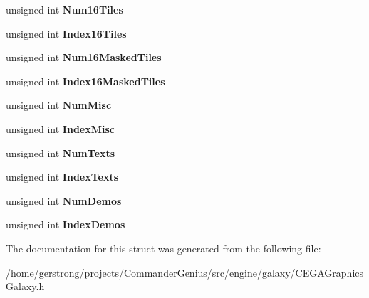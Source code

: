 \begin{DoxyCompactItemize}
\item 
\hypertarget{structgalaxy_1_1_episode_info_struct_ad7a7bb833553ebe16a7a545f356f29f6}{
unsigned int {\bfseries Num16Tiles}}
\label{structgalaxy_1_1_episode_info_struct_ad7a7bb833553ebe16a7a545f356f29f6}

\item 
\hypertarget{structgalaxy_1_1_episode_info_struct_a87b40fe870cb3f02fde25c795aeea388}{
unsigned int {\bfseries Index16Tiles}}
\label{structgalaxy_1_1_episode_info_struct_a87b40fe870cb3f02fde25c795aeea388}

\item 
\hypertarget{structgalaxy_1_1_episode_info_struct_ac8ad38c23ce44386c26d202b79007b28}{
unsigned int {\bfseries Num16MaskedTiles}}
\label{structgalaxy_1_1_episode_info_struct_ac8ad38c23ce44386c26d202b79007b28}

\item 
\hypertarget{structgalaxy_1_1_episode_info_struct_a8c27b2c1687d9d4bf4d1f751588df0c3}{
unsigned int {\bfseries Index16MaskedTiles}}
\label{structgalaxy_1_1_episode_info_struct_a8c27b2c1687d9d4bf4d1f751588df0c3}

\item 
\hypertarget{structgalaxy_1_1_episode_info_struct_a517f23e22cd547cbf9dd77c5ce0d187e}{
unsigned int {\bfseries NumMisc}}
\label{structgalaxy_1_1_episode_info_struct_a517f23e22cd547cbf9dd77c5ce0d187e}

\item 
\hypertarget{structgalaxy_1_1_episode_info_struct_a57d9a6efabf32030d9ddd078fcd56e20}{
unsigned int {\bfseries IndexMisc}}
\label{structgalaxy_1_1_episode_info_struct_a57d9a6efabf32030d9ddd078fcd56e20}

\item 
\hypertarget{structgalaxy_1_1_episode_info_struct_aa93640e051fd6141098ab3d9365b1217}{
unsigned int {\bfseries NumTexts}}
\label{structgalaxy_1_1_episode_info_struct_aa93640e051fd6141098ab3d9365b1217}

\item 
\hypertarget{structgalaxy_1_1_episode_info_struct_a4512a72bd5d70028c59e2997a93bbad3}{
unsigned int {\bfseries IndexTexts}}
\label{structgalaxy_1_1_episode_info_struct_a4512a72bd5d70028c59e2997a93bbad3}

\item 
\hypertarget{structgalaxy_1_1_episode_info_struct_a21fc476c46c84aa1fec7a87843665f4f}{
unsigned int {\bfseries NumDemos}}
\label{structgalaxy_1_1_episode_info_struct_a21fc476c46c84aa1fec7a87843665f4f}

\item 
\hypertarget{structgalaxy_1_1_episode_info_struct_a0834e2889015b0b83f2cc83117846c07}{
unsigned int {\bfseries IndexDemos}}
\label{structgalaxy_1_1_episode_info_struct_a0834e2889015b0b83f2cc83117846c07}

\end{DoxyCompactItemize}


The documentation for this struct was generated from the following file:\begin{DoxyCompactItemize}
\item 
/home/gerstrong/projects/CommanderGenius/src/engine/galaxy/CEGAGraphicsGalaxy.h\end{DoxyCompactItemize}
